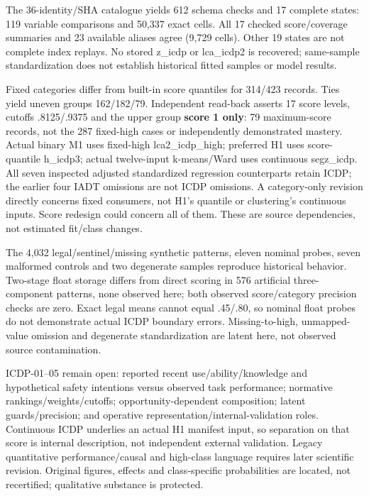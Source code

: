 \documentclass[11pt,a4paper]{article}
\begin{document}
The 36-identity/SHA catalogue yields 612 schema checks and 17 complete
states: 119 variable comparisons and 50,337 exact cells. All 17 checked
score/coverage summaries and 23 available aliases agree (9,729 cells).
Other 19 states are not complete index replays. No stored z\_icdp or
lca\_icdp2 is recovered; same-sample standardization does not establish
historical fitted samples or model results.

Fixed categories differ from built-in score quantiles for 314/423
records. Ties yield uneven groups 162/182/79. Independent read-back
asserts 17 score levels, cutoffs .8125/.9375 and the upper group
\textbf{score 1 only}: 79 maximum-score records, not the 287 fixed-high
cases or independently demonstrated mastery. Actual binary M1 uses
fixed-high lca2\_icdp\_high; preferred H1 uses score-quantile h\_icdp3;
actual twelve-input k-means/Ward uses continuous segz\_icdp.
All seven inspected adjusted standardized regression counterparts retain
ICDP; the earlier four IADT omissions are not ICDP omissions.
A category-only revision directly concerns fixed consumers, not H1's
quantile or clustering's continuous inputs. Score redesign could concern
all of them. These are source dependencies, not estimated fit/class changes.

The 4,032 legal/sentinel/missing synthetic patterns, eleven nominal probes,
seven malformed controls and two degenerate samples reproduce historical
behavior. Two-stage float storage differs from direct scoring in 576
artificial three-component patterns, none observed here; both observed
score/category precision checks are zero. Exact legal means cannot
equal .45/.80, so nominal float probes do not demonstrate actual ICDP
boundary errors. Missing-to-high, unmapped-value omission and degenerate
standardization are latent here, not observed source contamination.

ICDP-01--05 remain open: reported recent use/ability/knowledge and
hypothetical safety intentions versus observed task performance; normative
rankings/weights/cutoffs; opportunity-dependent composition; latent
guards/precision; and operative representation/internal-validation roles.
Continuous ICDP underlies an actual H1 manifest input, so separation on
that score is internal description, not independent external validation.
Legacy quantitative performance/causal and high-class language requires
later scientific revision. Original figures, effects and class-specific
probabilities are located, not recertified; qualitative substance is protected.
\end{document}
